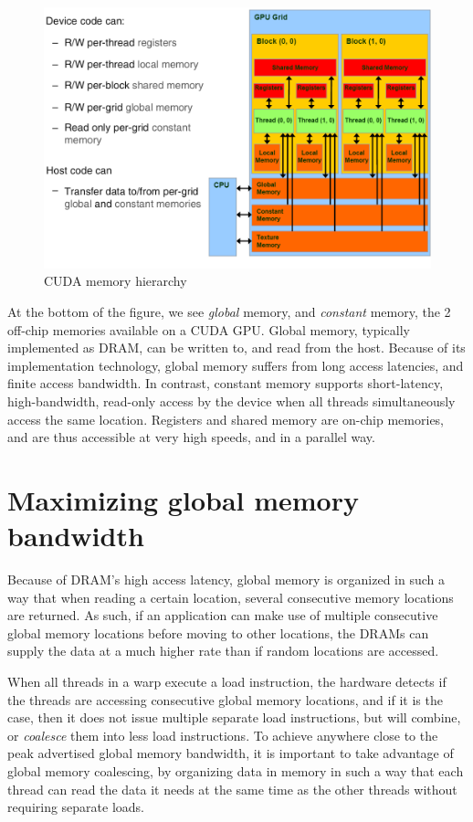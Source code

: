\documentclass[12pt, a4paper]{report}
\begin{document}
\begin{figure}[h]
\centering
\includegraphics[scale=0.35]{figs/cuda_memory_hierarchy}
\caption{CUDA memory hierarchy}
\label{fig:cuda_memory_hierarchy}
\end{figure}

At the bottom of the figure, we see \emph{global} memory, and \emph{constant}
memory, the 2 off-chip memories available on a CUDA GPU.
Global memory, typically implemented as DRAM, can be written to, and read from
the host.
Because of its implementation technology, global memory suffers from long access
latencies, and finite access bandwidth.
In contrast, constant memory supports short-latency, high-bandwidth, read-only
access by the device when all threads simultaneously access the same location.
Registers and shared memory are on-chip memories, and are thus accessible at
very high speeds, and in a parallel way.

\section{Maximizing global memory bandwidth}
Because of DRAM's high access latency, global memory is organized in such a way
that when reading a certain location, several consecutive memory locations are
returned.
As such, if an application can make use of multiple consecutive global memory locations
before moving to other locations, the DRAMs can supply the data at a much higher
rate than if random locations are accessed.

When all threads in a warp execute a load instruction, the hardware detects if
the threads are accessing consecutive global memory locations, and if it is the
case, then it does not issue multiple separate load instructions, but will
combine, or \emph{coalesce} them into less load instructions.
To achieve anywhere close to the peak advertised global memory bandwidth, it is
important to take advantage of global memory coalescing, by organizing data in
memory in such a way that each thread can read the data it needs at the same
time as the other threads without requiring separate loads.
\end{document}
